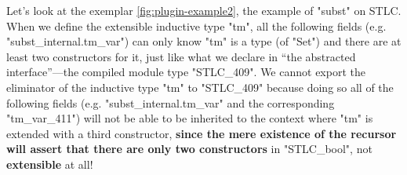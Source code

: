 





Let's look at the exemplar \cref{fig:plugin-example2}, the example of "subst" on STLC. When we define the extensible inductive type "tm", all the following fields (e.g. "subst_internal.tm_var") can only know "tm" is a type (of "Set") and there are at least two constructors for it, just like what we declare in ``the abstracted interface''---the compiled module type "STLC_409". We cannot export
the eliminator of the inductive type "tm" to "STLC_409" because doing so all of the following fields (e.g. "subst_internal.tm_var" and the corresponding "tm_var_411") will not be able to be inherited to the context where "tm"
is extended with a third constructor, \textbf{since the mere existence of the recursor will assert that there are only two constructors} in "STLC_bool", not
\textbf{extensible} at all! 

